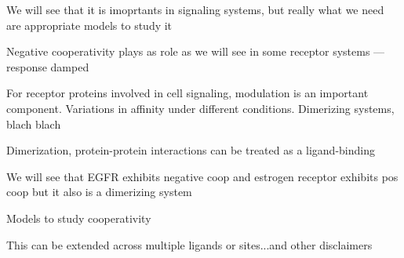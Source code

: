 We will see that it is imoprtants in signaling systems, but really what we need are appropriate models to study it



Negative cooperativity plays as role as we will see in some receptor systems --- response damped


For receptor proteins involved in cell signaling, modulation is an important component. Variations in affinity under different conditions. Dimerizing systems, blach blach

Dimerization, protein-protein interactions can be treated as a ligand-binding

We will see that EGFR exhibits negative coop and estrogen receptor exhibits pos coop but it also is a dimerizing system

Models to study cooperativity

This can be extended across multiple ligands or sites...and other disclaimers